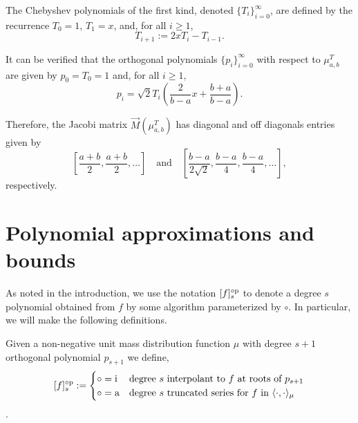 \begin{definition}
    The Chebyshev polynomials of the first kind, denoted \( \{ T_i \}_{i=0}^{\infty} \), are defined by the recurrence \( T_0 = 1 \), \( T_1 = x \), and, for all \( i \geq 1 \),
    \begin{equation*}
        T_{i+1} := 2 x T_i - T_{i-1}.
    \end{equation*}
\end{definition}

    It can be verified that the orthogonal polynomials \( \{p_i\}_{i=0}^{\infty} \) with respect to \( \mu_{a,b}^T \) are given by \( p_0 = T_0 = 1 \) and, for all \( i \geq 1 \),
    \begin{equation*}
        p_i = \sqrt{2} T_i \left( \frac{2}{b-a} x + \frac{b+a}{b-a} \right).
    \end{equation*}

    Therefore, the Jacobi matrix \( \vec{M}( \mu_{a,b}^T ) \) has diagonal and off diagonals entries given by
    \begin{equation*}
        \left[ \frac{a+b}{2}, \frac{a+b}{2}, \ldots \right]
        \quad\text{and}\quad
        \left[ \frac{b-a}{2\sqrt{2}} , \frac{b-a}{4}, \frac{b-a}{4} , \ldots  \right],
    \end{equation*}
    respectively.



\section{Polynomial approximations and bounds}
\label{sec:uniform_poly_bounds}

As noted in the introduction, we use the notation \( \ff{f}{s} \) to denote a degree \( s \) polynomial obtained from \( f \) by some algorithm parameterized by \( \circ \).
In particular, we will make the following definitions.
\begin{definition}
    \label{def:fffs}
    Given a non-negative unit mass distribution function \( \mu \) with degree \( s+1 \) orthogonal polynomial \( p_{s+1} \) we define,
    \begin{equation*}
        \ff{f}{s} := 
        \begin{cases}
            \circ = \text{i} & \text{degree $s$ interpolant to \( f \) at roots of $p_{s+1}$} \\
            \circ = \text{a} & \text{degree $s$ truncated series for \( f \) in \( \langle \cdot, \cdot \rangle_\mu \)} \\
        \end{cases}
    \end{equation*}.
\end{definition}


